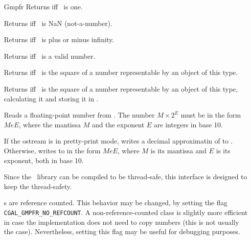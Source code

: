 \begin{ccRefClass} {Gmpfr}
        {Returns  iff \ccVar~is one.}

        {Returns  iff \ccVar~is NaN (not-a-number).}

        {Returns  iff \ccVar~is plus or minus infinity.}

        {Returns  iff \ccVar~is a valid number.}

        {Returns  iff \ccVar~is the square of a number
        representable by an object of this type.}

        {Returns  iff \ccVar~is the square of a number
        representable by an object of this type, calculating it and storing
        it in .}



        {Reads a floating-point number from . The number
        \(M \times 2^E\) must be in the form \(MeE\), where the mantissa
        \(M\) and the exponent \(E\) are integers in base 10.}

        {If the ostream  is in pretty-print mode, writes a decimal
        approximatin of  to . Otherwise, writes  to
         in the form \(MeE\), where \(M\) is its mantissa and
        \(E\) is its exponent, both in base 10.}


\ccImplementation

Since the \mpfr\ library can be compiled to be thread-safe, this interface
is designed to keep the thread-safety.

s are reference counted. This behavior may be changed, by
setting the flag \verb+CGAL_GMPFR_NO_REFCOUNT+. A non-reference-counted
class is slightly more efficient in case the implementation does not need
to copy numbers (this is not usually the case). Nevertheless, setting this
flag may be useful for debugging purposes.

\ccSeeAlso
{}\\

\end{ccRefClass}
